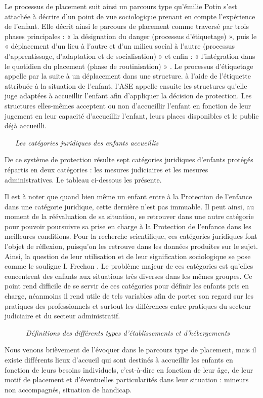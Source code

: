 \documentclass[
  12,
  a4paper,
]{report}
\begin{document}
Le processus de placement suit ainsi un parcours type qu'émilie Potin
s'est attachée à décrire d'un point de vue sociologique prenant en
compte l'expérience de l'enfant. Elle décrit ainsi le parcours de
placement comme traversé par trois phases principales : « la désignation
du danger (processus d'étiquetage) », puis le « déplacement d'un lieu à
l'autre et d'un milieu social à l'autre (processus d'apprentissage,
d'adaptation et de socialisation) » et enfin : « l'intégration dans le
quotidien du placement (phase de routinisation) » . Le processus
d'étiquetage appelle par la suite à un déplacement dans une structure. à
l'aide de l'étiquette attribuée à la situation de l'enfant, l'ASE
appelle ensuite les structures qu'elle juge adaptées à accueillir
l'enfant afin d'appliquer la décision de protection. Les structures
elles-mêmes acceptent ou non d'accueillir l'enfant en fonction de leur
jugement en leur capacité d'accueillir l'enfant, leurs places
disponibles et le public déjà accueilli.

~~~\emph{Les catégories juridiques des enfants accueillis}

De ce système de protection résulte sept catégories juridiques d'enfants
protégés répartis en deux catégories : les mesures judiciaires et les
mesures administratives. Le tableau ci-dessous les présente.

Il est à noter que quand bien même un enfant entre à la Protection de
l'enfance dans une catégorie juridique, cette dernière n'est pas
immuable. Il peut ainsi, au moment de la réévaluation de sa situation,
se retrouver dans une autre catégorie pour pouvoir poursuivre sa prise
en charge à la Protection de l'enfance dans les meilleures conditions.
Pour la recherche scientifique, ces catégories juridiques font l'objet
de réflexion, puisqu'on les retrouve dans les données produites sur le
sujet. Ainsi, la question de leur utilisation et de leur signification
sociologique se pose comme le souligne I. Frechon . Le problème majeur
de ces catégories est qu'elles concentrent des enfants aux situations
très diverses dans les mêmes groupes. Ce point rend difficile de se
servir de ces catégories pour définir les enfants pris en charge,
néanmoins il rend utile de tels variables afin de porter son regard sur
les pratiques des professionnels et surtout les différences entre
pratiques du secteur judiciaire et du secteur administratif.

~~~~~~\emph{Définitions des différents types d'établissements et
d'hébergements}

Nous venons brièvement de l'évoquer dans le parcours type de placement,
mais il existe différents lieux d'accueil qui sont destinés à accueillir
les enfants en fonction de leurs besoins individuels, c'est-à-dire en
fonction de leur âge, de leur motif de placement et d'éventuelles
particularités dans leur situation : mineurs non accompagnés, situation
de handicap.
\end{document}
